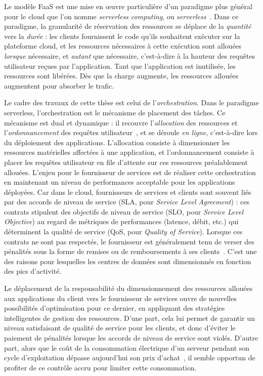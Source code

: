Le modèle FaaS est une mise en œuvre particulière d'un paradigme plus général pour le cloud que l'on nomme \textit{serverless computing}, ou \textit{serverless}~\cite{hellersteinServerlessComputingOne2019}. Dans ce paradigme, la granularité de réservation des ressources se déplace de la \textit{quantité} vers la \textit{durée} : les clients fournissent le code qu'ils souhaitent exécuter sur la plateforme cloud, et les ressources nécessaires à cette exécution sont allouées \textit{lorsque} nécessaire, et \textit{autant} que nécessaire, c'est-à-dire à la hauteur des requêtes utilisateur reçues par l'application. Tant que l'application est inutilisée, les ressources sont libérées. Dès que la charge augmente, les ressources allouées augmentent pour absorber le trafic.

Le cadre des travaux de cette thèse est celui de l'\textit{orchestration}. Dans le paradigme serverless, l'orchestration est le mécanisme de placement des tâches. Ce mécanisme est dual et dynamique : il recouvre l'\textit{allocation} des ressources et l'\textit{ordonnancement} des requêtes utilisateur~\cite{vaneykSPECRGReferenceArchitecture2019}, et se déroule \textit{en ligne}, c'est-à-dire lors du déploiement des applications. L'allocation consiste à dimensionner les ressources matérielles affectées à une application, et l'ordonnancement consiste à placer les requêtes utilisateur en file d'attente sur ces ressources préalablement allouées. L'enjeu pour le fournisseur de services est de réaliser cette orchestration en maintenant un niveau de performances acceptable pour les applications déployées. Car dans le cloud, fournisseurs de services et clients sont souvent liés par des accords de niveau de service (\gls{SLA}, pour \textit{Service Level Agreement}) : ces contrats stipulent des objectifs de niveau de service (\gls{SLO}, pour \textit{Service Level Objective}) au regard de métriques de performances (latence, débit, etc.) qui déterminent la qualité de service (\gls{QoS}, pour \textit{Quality of Service}). Lorsque ces contrats ne sont pas respectés, le fournisseur est généralement tenu de verser des pénalités sous la forme de remises ou de remboursements à ses clients~\cite{buyyaSLAorientedResourceProvisioning2011}. C'est une des raisons pour lesquelles les centres de données sont dimensionnés en fonction des pics d'activité.

Le déplacement de la responsabilité du dimensionnement des ressources allouées aux applications du client vers le fournisseur de services ouvre de nouvelles possibilités d'optimisation pour ce dernier, en appliquant des stratégies intelligentes de gestion des ressources. D'une part, cela lui permet de garantir un niveau satisfaisant de qualité de service pour les clients, et donc d'éviter le paiement de pénalités lorsque les accords de niveau de service sont violés. D'autre part, alors que le coût de la consommation électrique d'un serveur pendant son cycle d'exploitation dépasse aujourd'hui son prix d'achat~\cite{orgerieSurveyTechniquesImproving2014}, il semble opportun de profiter de ce contrôle accru pour limiter cette consommation.

